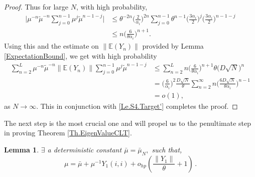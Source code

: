 \documentclass[11pt, reqno]{amsart}
\numberwithin{equation}{section}
\newtheorem{lemma}{Lemma}[section]
\newtheorem{remark}{Remark}[section]
\newcommand{\E}{\mbox{${\mathbb E}$}}
\begin{document}
\begin{proof}
Thus for large $N$, with high probability,
\begin{align*}
\Big|\mu^{-n}\tilde{\mu}^{-n}\sum_{j=0}^{n-1}\mu^j\tilde{\mu}^{n-1-j}\Big|
&\le \theta^{-2n}\Big(\frac{2}{\alpha_i}\Big)^{2n} \sum_{j=0}^{n-1} \theta^{n-1}\Big(\frac{3\alpha_i}{2}\Big)^j \Big(\frac{3\alpha_i}{2}\Big)^{n-1-j} \\
&\le n\Big(\frac{6}{\theta\alpha_i}\Big)^{n+1}.
\end{align*}
Using this and the estimate on $\|\E(Y_n)\|$ provided by Lemma \ref{ExpectationBound}, we get with high probability
\begin{align*}
\sum_{n=2}^L \mu^{-n}\tilde{\mu}^{-n}\|\E(Y_n)\| \sum_{j=0}^{n-1}\mu^j\tilde{\mu}^{n-1-j}
&\le \sum_{n=2}^L n\Big(\frac{6}{\theta\alpha_i}\Big)^{n+1} \theta\big(D\sqrt{N}\big)^{n} \\
&=\Big(\frac{6}{\alpha_i}\Big)^2 \frac{D\sqrt{N}}{\theta} \sum_{n=2}^\infty n \Big(\frac{6D\sqrt{N}}{\theta\alpha_i}\Big)^{n-1} \\
&= o(1),
\end{align*}
as $N \to \infty$. This in conjunction with \eqref{Le.S4.Target'} completes the proof.
\end{proof}


The next step is the most crucial one and will propel us to the penultimate step in proving Theorem \ref{Th.EigenValueCLT}.


\begin{lemma}\label{Le.S5}
$\exists$ a deterministic constant $\bar\mu = \bar\mu_N,$ such that, 
\[
\mu=\bar\mu+\mu^{-1}Y_1(i,i)+o_{hp}\left(\frac{\|Y_1\|}{\theta}+1 \right)\,.
\]    
\end{lemma}
\end{document}
